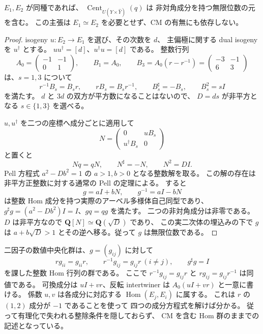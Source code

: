 \begin{proposition}[同種対に対する整数係数の混合元]
\label{mbfc:prop:two-isogenous-mixing}
$E_1,E_2$ が同種であれば、
$\operatorname{Cent}_{U(Y\times\widehat Y)}(q)$ は
非対角成分を持つ無限位数の元を含む。
この主張は $E_1\simeq E_2$ を必要とせず、CM の有無にも依存しない。
\end{proposition}
\begin{proof}
isogeny $u:E_2\to E_1$ を選び、その次数を $d$、
主偏極に関する dual isogeny を $u^\dagger$ とする。
$uu^\dagger=[d]$、$u^\dagger u=[d]$ である。
整数行列
\[
 A_0=\begin{pmatrix}-1&-1\\0&1\end{pmatrix},\qquad
 B_1=A_0,\qquad B_3=A_0(r-r^{-1})
     =\begin{pmatrix}-3&-1\\6&3\end{pmatrix}
\]
は、$s=1,3$ について
\[
 r^{-1}B_s=B_sr,\qquad
 rB_s=B_sr^{-1},\qquad
 B_s^\sharp=-B_s,\qquad B_s^2=sI
\]
を満たす。
$d$ と $3d$ の双方が平方数になることはないので、
$D=ds$ が非平方となる $s\in\{1,3\}$ を選べる。

$u,u^\dagger$ を二つの座標へ成分ごとに適用して
\[
 N=\begin{pmatrix}0&uB_s\\u^\dagger B_s&0\end{pmatrix}
\]
と置くと
\[
 Nq=qN,\qquad N^\sharp=-N,\qquad N^2=DI.
\]
Pell 方程式 $a^2-Db^2=1$ の $a>1,b>0$ となる整数解を取る。
この解の存在は非平方正整数に対する通常の Pell の定理による。
すると
\[
 g=aI+bN,\qquad g^{-1}=aI-bN
\]
は整数 Hom 成分を持つ実際のアーベル多様体自己同型であり、
$g^\sharp g=(a^2-Db^2)I=I$、$gq=qg$ を満たす。
二つの非対角成分は非零である。
$D$ は非平方なので $\mathbf Q[N]\simeq\mathbf Q(\sqrt D)$ であり、
この実二次体の埋込みの下で $g$ は
$a+b\sqrt D>1$ とその逆へ移る。従って $g$ は無限位数である。
\end{proof}

\begin{remark}
\label{mbfc:rem:two-integral-centralizer}
二因子の数値中央化群は、$g=(g_{ij})$ に対して
\[
 rg_{ii}=g_{ii}r,\qquad
 r^{-1}g_{ij}=g_{ij}r\ (i\ne j),\qquad
 g^\sharp g=I
\]
を課した整数 Hom 行列の群である。
ここで $r^{-1}g_{ij}=g_{ij}r$ と $rg_{ij}=g_{ij}r^{-1}$ は同値である。
可換成分は $uI+vr$、反転 intertwiner は
$A_0(uI+vr)$ と一意に書ける。
係数 $u,v$ は各成分に対応する $\operatorname{Hom}(E_j,E_i)$ に属する。
これは $r$ の $(1,2)$ 成分が $-1$ であることを使って
四つの成分方程式を解けば分かる。
従って有理化で失われる整除条件を隠しておらず、
CM を含む Hom 群のままでの記述となっている。
\end{remark}

